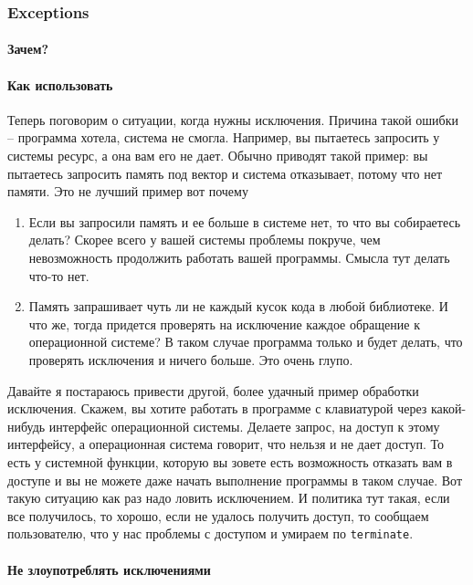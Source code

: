 \subsubsection{Exceptions}

\paragraph{Зачем?}

\paragraph{Как использовать}

Теперь поговорим о ситуации, когда нужны исключения.
Причина такой ошибки -- программа хотела, система не смогла.
Например, вы пытаетесь запросить у системы ресурс, а она вам его не дает.
Обычно приводят такой пример: вы пытаетесь запросить память под вектор и система отказывает, потому что нет памяти.
Это не лучший пример вот почему
\begin{enumerate}
\item Если вы запросили память и ее больше в системе нет, то что вы собираетесь делать?
Скорее всего у вашей системы проблемы покруче, чем невозможность продолжить работать вашей программы.
Смысла тут делать что-то нет.

\item Память запрашивает чуть ли не каждый кусок кода в любой библиотеке.
И что же, тогда придется проверять на исключение каждое обращение к операционной системе?
В таком случае программа только и будет делать, что проверять исключения и ничего больше.
Это очень глупо.
\end{enumerate}
Давайте я постараюсь привести другой, более удачный пример обработки исключения.
Скажем, вы хотите работать в программе с клавиатурой через какой-нибудь интерфейс операционной системы.
Делаете запрос, на доступ к этому интерфейсу, а операционная система говорит, что нельзя и не дает доступ.
То есть у системной функции, которую вы зовете есть возможность отказать вам в доступе и вы не можете даже начать выполнение программы в таком случае.
Вот такую ситуацию как раз надо ловить исключением.
И политика тут такая, если все получилось, то хорошо, если не удалось получить доступ, то сообщаем пользователю, что у нас проблемы с доступом и умираем по \verb"terminate".

\paragraph{Не злоупотреблять исключениями}


